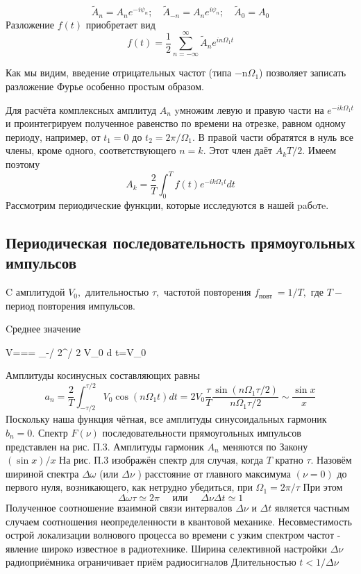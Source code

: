 $$
\tilde{A}_{n}=A_{n} e^{-i \psi_{n}} ; \quad \tilde{A}_{-n}=A_{n} e^{i \psi_{n}} ; \quad \tilde{A}_{0}=A_{0}
$$
Разложение $f(t)$ приобретает вид
$$
f(t)=\frac{1}{2} \sum_{n=-\infty}^{\infty} \tilde{A}_{n} e^{i n \Omega_{1} t}
$$

Как мы видим, введение отрицательных частот (типа −n$\Omega_1$) позволяет записать разложение Фурье особенно простым образом. 

Для расчёта комплексных амплитуд $A_{n}$ yмножим левую и правую части на $e^{-i k \Omega_{1} t}$ и проинтегрируем полученное равенство по времени на отрезке, равном одному периоду, например, от $t_{1}=0$ до $t_{2}=2 \pi / \Omega_{1} .$ В правой части обратятся в нуль все члены, кроме одного, соответствующего $n=k .$ Этот член даёт $A_{k} T / 2 .$ Имеем поэтому
$$
A_{k}=\frac{2}{T} \int_{0}^{T} f(t) e^{-i k \Omega_{1} t} d t
$$
Рассмотрим периодические функции, которые исследуются в нашей paбoтe.


\subsection{Периодическая последовательность прямоугольных импульсов}
C амплитудой $V_{0},$ длительностью $\tau,$ частотой повторения $f_{\text {повт }}=1 / T,$ где $T-$ период повторения импульсов.


Cреднее значение


\langle V\rangle=== \int_{-\tau / 2}^{\tau / 2} V_{0} d t=V_{0} 

Амплитуды косинусных составляющих равны
$$
a_{n}=\frac{2}{T} \int_{-\tau / 2}^{\tau / 2} V_{0} \cos \left(n \Omega_{1} t\right) d t=2 V_{0} \frac{\tau}{T} \frac{\sin \left(n \Omega_{1} \tau / 2\right)}{n \Omega_{1} \tau / 2} \sim \frac{\sin x}{x}
$$
Поскольку наша функция чётная, все амплитуды синусоидальных гармоник $b_{n}=0 .$ Спектр $F(\nu)$ последовательности прямоугольных импульсов представлен на рис. П.3. Амплитуды гармоник $A_{n}$ меняются по Закону $(\sin x) / x$
На рис. П.3 изображён спектр для случая, когда $T$ кратно $\tau .$ Назовём шириной спектра $\Delta \omega$ (или $\Delta \nu$ ) расстояние от главного максимума $(\nu=0)$ до первого нуля, возникающего, как нетрудно убедиться, при $\Omega_{1}=2 \pi / \tau$ При этом
$$
\Delta \omega \tau \simeq 2 \pi \quad \text { или } \quad \Delta \nu \Delta t \simeq 1
$$
Полученное соотношение взаимной связи интервалов $\Delta \nu$ и $\Delta t$ является
частным случаем соотношения неопределенности в квантовой механике. Несовместимость острой локализации волнового процесса во времени с узким спектром частот - явление широко известное в радиотехнике. Ширина селективной настройки $\Delta \nu$ радиоприёмника ограничивает приём радиосигналов Длительностью $t<1 / \Delta \nu$

